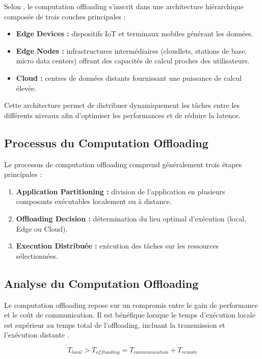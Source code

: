 \documentclass[12pt,a4paper]{report}
\begin{document}
Selon \cite{lin2020}, le computation offloading s’inscrit dans une architecture hiérarchique composée de trois couches principales :

\begin{itemize}
    \item \textbf{Edge Devices :} dispositifs IoT et terminaux mobiles générant les données.
    \item \textbf{Edge Nodes :} infrastructures intermédiaires (cloudlets, stations de base, micro data centers) offrant des capacités de calcul proches des utilisateurs.
    \item \textbf{Cloud :} centres de données distants fournissant une puissance de calcul élevée.
\end{itemize}

Cette architecture permet de distribuer dynamiquement les tâches entre les différents niveaux afin d’optimiser les performances et de réduire la latence.

\subsection{Processus du Computation Offloading}

Le processus de computation offloading comprend généralement trois étapes principales \cite{lin2020} :

\begin{enumerate}
    \item \textbf{Application Partitioning :} division de l’application en plusieurs composants exécutables localement ou à distance.
    \item \textbf{Offloading Decision :} détermination du lieu optimal d’exécution (local, Edge ou Cloud).
    \item \textbf{Execution Distribuée :} exécution des tâches sur les ressources sélectionnées.
\end{enumerate}

\subsection{Analyse du Computation Offloading}

Le computation offloading repose sur un compromis entre le gain de performance et le coût de communication. Il est bénéfique lorsque le temps d’exécution locale est supérieur au temps total de l’offloading, incluant la transmission et l’exécution distante \cite{lin2020}.

\begin{equation}
T_{local} > T_{offloading} = T_{communication} + T_{remote}
\end{equation}
\end{document}
